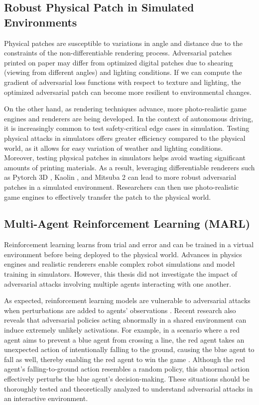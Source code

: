 \subsection{Robust Physical Patch in Simulated Environments}

Physical patches are susceptible to variations in angle and distance due to the constraints of the non-differentiable rendering process. Adversarial patches printed on paper may differ from optimized digital patches due to shearing (viewing from different angles) and lighting conditions. If we can compute the gradient of adversarial loss functions with respect to texture and lighting, the optimized adversarial patch can become more resilient to environmental changes. 

On the other hand, as rendering techniques advance, more photo-realistic game engines and renderers are being developed. In the context of autonomous driving, it is increasingly common to test safety-critical edge cases in simulation. Testing physical attacks in simulators offers greater efficiency compared to the physical world, as it allows for easy variation of weather and lighting conditions. Moreover, testing physical patches in simulators helps avoid wasting significant amounts of printing materials. As a result, leveraging differentiable renderers such as Pytorch 3D \citep{ravi2020pytorch3d}, Kaolin \citep{KaolinLibrary}, and Mitsuba 2 \citep{nimier2019mitsuba} can lead to more robust adversarial patches in a simulated environment. Researchers can then use photo-realistic game engines to effectively transfer the patch to the physical world.

\subsection{Multi-Agent Reinforcement Learning (MARL)}

Reinforcement learning learns from trial and error and can be trained in a virtual environment before being deployed to the physical world. Advances in physics engines and realistic renderers enable complex robot simulations and model training in simulators. However, this thesis did not investigate the impact of adversarial attacks involving multiple agents interacting with one another.

As expected, reinforcement learning models are vulnerable to adversarial attacks when perturbations are added to agents' observations \citep{chen2019adversarial}. Recent research also reveals that adversarial policies acting abnormally in a shared environment can induce extremely unlikely activations. For example, in a scenario where a red agent aims to prevent a blue agent from crossing a line, the red agent takes an unexpected action of intentionally falling to the ground, causing the blue agent to fall as well, thereby enabling the red agent to win the game \citep{gleave2021adversarial}. Although the red agent's falling-to-ground action resembles a random policy, this abnormal action effectively perturbs the blue agent's decision-making. These situations should be thoroughly tested and theoretically analyzed to understand adversarial attacks in an interactive environment.


